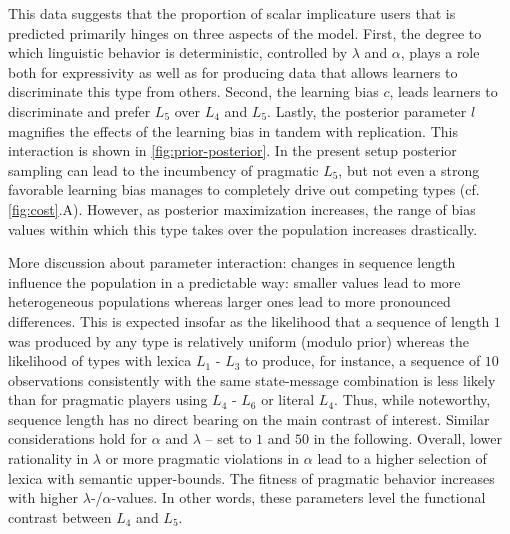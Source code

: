\documentclass[a4paper]{article}
\newcommand{\hl}[1]{\textcolor[rgb]{.8,.33,.0}{#1}}%
\begin{document}
This data suggests that the proportion of scalar implicature users that is predicted primarily hinges on three aspects of the model. First, the degree to which linguistic behavior is deterministic, controlled by $\lambda$ and $\alpha$, plays a role both for expressivity as well as for producing data that allows learners to discriminate this type from others. Second, the learning bias $c$, leads learners to discriminate and prefer $L_5$ over $L_4$ and $L_5$. Lastly, the posterior parameter $l$ magnifies the effects of the learning bias in tandem with replication. This interaction is shown in \ref{fig:prior-posterior}. In the present setup posterior sampling can lead to the incumbency of pragmatic $L_5$, but not even a strong favorable learning bias manages to completely drive out competing types (cf. \ref{fig:cost}.A). However, as posterior maximization increases, the range of bias values within which this type takes over the population increases drastically. 

\hl{More  discussion about parameter interaction: changes in sequence length influence the population in a predictable way: smaller values lead to more heterogeneous populations whereas larger ones lead to more pronounced differences. This is expected insofar as the likelihood that a sequence of length $1$ was produced by any type is relatively uniform (modulo prior) whereas the likelihood of types with lexica $L_1$ - $L_3$ to produce, for instance, a sequence of $10$ observations consistently with the same state-message combination is less likely than for pragmatic players using $L_4$ - $L_6$ or literal $L_4$. Thus, while noteworthy, sequence length has no direct bearing on the main contrast of interest. Similar considerations hold for $\alpha$ and $\lambda$ -- set to $1$ and $50$ in the following. Overall, lower rationality in $\lambda$ or more pragmatic violations in $\alpha$ lead to a higher selection of lexica with semantic upper-bounds. The fitness of pragmatic behavior increases with higher $\lambda$-/$\alpha$-values. In other words, these parameters level the functional contrast between $L_4$ and $L_5$. }
\end{document}
